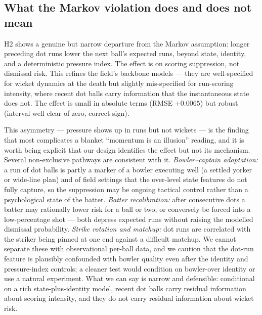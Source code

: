 \subsection{What the Markov violation does and does not mean}
H2 shows a genuine but narrow departure from the Markov assumption: longer
preceding dot runs lower the next ball's expected runs, beyond state, identity,
and a deterministic pressure index. The effect is on scoring suppression, not
dismissal risk. This refines the field's backbone models --- they are
well-specified for wicket dynamics at the death but slightly mis-specified for
run-scoring intensity, where recent dot balls carry information that the
instantaneous state does not. The effect is small in absolute terms (RMSE
$+0.0065$) but robust (interval well clear of zero, correct sign).

This asymmetry --- pressure shows up in runs but not wickets --- is the finding that
most complicates a blanket ``momentum is an illusion'' reading, and it is worth
being explicit that our design identifies the effect but not its mechanism. Several
non-exclusive pathways are consistent with it. \emph{Bowler--captain adaptation:}
a run of dot balls is partly a marker of a bowler executing well (a settled yorker
or wide-line plan) and of field settings that the over-level state features do not
fully capture, so the suppression may be ongoing tactical control rather than a
psychological state of the batter. \emph{Batter recalibration:} after consecutive
dots a batter may rationally lower risk for a ball or two, or conversely be forced
into a low-percentage shot --- both depress expected runs without raising the
modelled dismissal probability. \emph{Strike rotation and matchup:} dot runs are
correlated with the striker being pinned at one end against a difficult matchup. We
cannot separate these with observational per-ball data, and we caution that the
dot-run feature is plausibly confounded with bowler quality even after the identity
and pressure-index controls; a cleaner test would condition on bowler-over identity
or use a natural experiment. What we can say is narrow and defensible: conditional
on a rich state-plus-identity model, recent dot balls carry residual information
about scoring intensity, and they do not carry residual information about wicket
risk.

